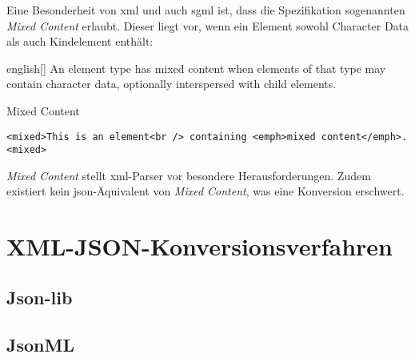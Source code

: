 Eine Besonderheit von \acrshort{xml} und auch \acrshort{sgml} ist, dass die Spezifikation sogenannten \emph{Mixed Content} erlaubt. Dieser liegt vor, wenn ein Element sowohl Character Data als auch Kindelement enthält:

\begin{foreigndisplayquote}{english}[{\cite[Abschnitt 3.2.2]{maler2008xml}}]
    An element type has mixed content when elements of that type may contain character data, optionally interspersed with child elements.
\end{foreigndisplayquote}

\begin{example} Mixed Content
    \begin{verbatim}
<mixed>This is an element<br /> containing <emph>mixed content</emph>.<mixed>
    \end{verbatim}
\end{example}

\emph{Mixed Content} stellt \acrshort{xml}-Parser vor besondere Herausforderungen\cite{mcgrath2002mixedcontent}. Zudem existiert kein \acrshort{json}-Äquivalent von \emph{Mixed Content}, was eine Konversion erschwert.

\section{XML-JSON-Konversionsverfahren}

\subsection{Json-lib}

\subsection{JsonML}

